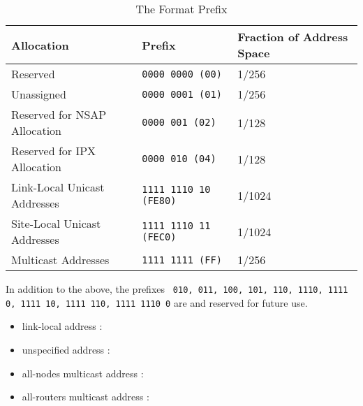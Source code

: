 \documentclass[dvipsnames]{article}
\begin{document}
\begin{table}[h]
  \centering
  \begin{tabularx}{1.0\linewidth}{XXX}
    Allocation& Prefix & Fraction of Address Space \\
    \hline
    Reserved & \texttt{0000 0000 (00)} & 1/256\\
    Unassigned & \texttt{0000 0001 (01)} & 1/256\\
    Reserved for NSAP Allocation & \texttt{0000 001 (02)} & 1/128\\
    Reserved for IPX Allocation & \texttt{0000 010 (04)} & 1/128\\
    Link-Local Unicast Addresses & \texttt{1111 1110 10 (FE80)} & 1/1024\\
    Site-Local Unicast Addresses & \texttt{1111 1110 11 (FEC0)} & 1/1024\\
    Multicast Addresses & \texttt{1111 1111 (FF)} & 1/256\\
  \end{tabularx}
  \caption{The Format Prefix}
  \label{tab:fp}
\end{table}

In addition to the above, the prefixes \texttt{
  010, 011, 100, 101, 110, 1110, 1111 0, 1111 10, 1111 110, 1111 1110 0} are
 and reserved for future use.




\clearpage{}

\begin{itemize}
\item link-local address : 
\item unspecified address : 
\item all-nodes multicast address : 
\item all-routers multicast address : 
\end{itemize}
\end{document}
